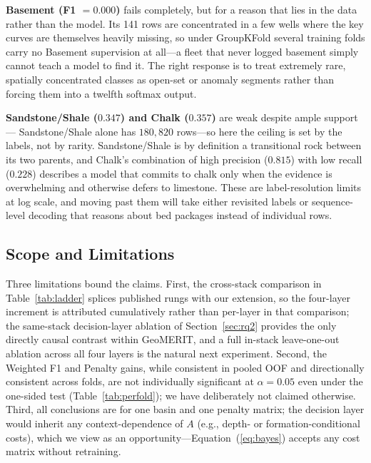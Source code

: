 \documentclass[bdcc,article,submit,pdftex,moreauthors]{Definitions/mdpi}
\begin{document}
\textbf{Basement (F1 $=0.000$)} fails completely, but for a reason that lies in the data rather
than the model. Its 141 rows are concentrated in a few wells where the key curves are
themselves heavily missing, so under GroupKFold several training folds carry no Basement
supervision at all---a fleet that never logged basement simply cannot teach a model to find it.
The right response is to treat extremely rare, spatially concentrated classes as open-set or
anomaly segments rather than forcing them into a twelfth softmax output.

\textbf{Sandstone/Shale ($0.347$) and Chalk ($0.357$)} are weak despite ample support---
Sandstone/Shale alone has $180{,}820$ rows---so here the ceiling is set by the labels, not by
rarity. Sandstone/Shale is by definition a transitional rock between its two parents, and
Chalk's combination of high precision ($0.815$) with low recall ($0.228$) describes a model
that commits to chalk only when the evidence is overwhelming and otherwise defers to limestone.
These are label-resolution limits at log scale, and moving past them will take either revisited
labels or sequence-level decoding that reasons about bed packages instead of individual rows.

\subsection{Scope and Limitations}
\label{sec:limits}
Three limitations bound the claims. First, the cross-stack comparison in
Table~\ref{tab:ladder} splices published rungs with our extension, so the four-layer
increment is attributed cumulatively rather than per-layer in that comparison; the
same-stack decision-layer ablation of Section~\ref{sec:rq2} provides the only directly
causal contrast within GeoMERIT, and a full in-stack leave-one-out ablation across all four
layers is the natural next experiment. Second, the Weighted F1 and Penalty gains, while
consistent in pooled OOF and directionally consistent across folds, are not individually
significant at $\alpha=0.05$ even under the one-sided test (Table~\ref{tab:perfold}); we
have deliberately not claimed otherwise. Third, all conclusions are for one basin and one
penalty matrix; the decision layer would inherit any context-dependence of $A$ (e.g., depth-
or formation-conditional costs), which we view as an opportunity---Equation~(\ref{eq:bayes})
accepts any cost matrix without retraining.
\end{document}
